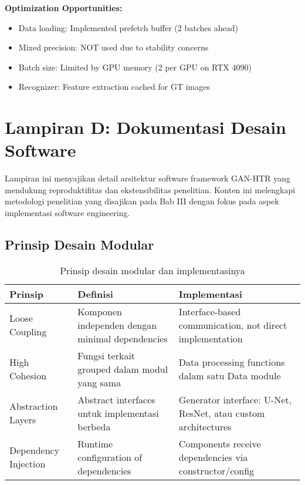 \documentclass[12pt,a4paper]{article}
\begin{document}
\textbf{Optimization Opportunities:}
\begin{itemize}
    \item Data loading: Implemented prefetch buffer (2 batches ahead)
    \item Mixed precision: NOT used due to stability concerns
    \item Batch size: Limited by GPU memory (2 per GPU on RTX 4090)
    \item Recognizer: Feature extraction cached for GT images
\end{itemize}


\section{Lampiran D: Dokumentasi Desain Software}
\label{appendix:software-design}

Lampiran ini menyajikan detail arsitektur software framework GAN-HTR yang mendukung reproduktifitas dan ekstensibilitas penelitian. Konten ini melengkapi metodologi penelitian yang disajikan pada Bab III dengan fokus pada aspek implementasi software engineering.

\subsection{Prinsip Desain Modular}

\begin{table}[H]
\centering
\caption{Prinsip desain modular dan implementasinya}
\label{tab:appendix-modular-principles}
\small
\begin{tabular}{|p{3.5cm}|p{5cm}|p{5cm}|}
\hline
\textbf{Prinsip} & \textbf{Definisi} & \textbf{Implementasi} \\ \hline
Loose Coupling & Komponen independen dengan minimal dependencies & Interface-based communication, not direct implementation \\ \hline
High Cohesion & Fungsi terkait grouped dalam modul yang sama & Data processing functions dalam satu Data module \\ \hline
Abstraction Layers & Abstract interfaces untuk implementasi berbeda & Generator interface: U-Net, ResNet, atau custom architectures \\ \hline
Dependency Injection & Runtime configuration of dependencies & Components receive dependencies via constructor/config \\ \hline
\end{tabular}
\end{table}
\end{document}
